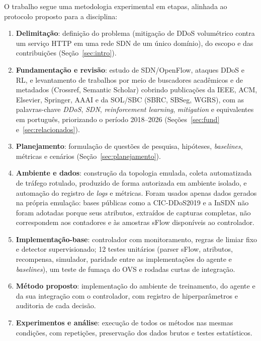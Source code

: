 \documentclass[12pt]{article}
\begin{document}
O trabalho segue uma metodologia experimental em etapas, alinhada ao protocolo
proposto para a disciplina:
\begin{enumerate}
  \item \textbf{Delimitação}: definição do problema (mitigação de DDoS
        volumétrico contra um serviço HTTP em uma rede SDN de um único
        domínio), do escopo e das contribuições (Seção~\ref{sec:intro}).
  \item \textbf{Fundamentação e revisão}: estudo de SDN/OpenFlow, ataques DDoS
        e RL, e levantamento de trabalhos por meio de buscadores acadêmicos e
        de metadados (Crossref, Semantic Scholar) cobrindo publicações da IEEE,
        ACM, Elsevier, Springer, AAAI e da SOL/SBC (SBRC, SBSeg, WGRS), com as
        palavras-chave
        \textit{DDoS}, \textit{SDN}, \textit{reinforcement learning},
        \textit{mitigation} e equivalentes em português, priorizando o período
        2018--2026 (Seções~\ref{sec:fund} e~\ref{sec:relacionados}).
  \item \textbf{Planejamento}: formulação de questões de pesquisa, hipóteses,
        \textit{baselines}, métricas e cenários (Seção~\ref{sec:planejamento}).
  \item \textbf{Ambiente e dados}: construção da topologia emulada, coleta
        automatizada de tráfego rotulado, produzido de forma autorizada em
        ambiente isolado, e automação do registro de \textit{logs} e métricas.
        Foram usados apenas dados gerados na própria emulação: bases públicas
        como a CIC-DDoS2019 \cite{sharafaldin2019cicddos} e a InSDN
        \cite{elsayed2020insdn} não foram adotadas porque seus atributos, extraídos
        de capturas completas, não correspondem aos contadores e às amostras
        sFlow disponíveis ao controlador.
  \item \textbf{Implementação-base}: controlador com monitoramento, regras de
        limiar fixo e detector supervisionado; 12 testes unitários (parser
        sFlow, atributos, recompensa, simulador, paridade entre as
        implementações do agente e \textit{baselines}), um teste de fumaça do
        OVS e rodadas curtas de integração.
  \item \textbf{Método proposto}: implementação do ambiente de treinamento, do
        agente e da sua integração com o controlador, com registro de
        hiperparâmetros e auditoria de cada decisão.
  \item \textbf{Experimentos e análise}: execução de todos os métodos nas
        mesmas condições, com repetições, preservação dos dados brutos e testes
        estatísticos.
\end{enumerate}
\end{document}
